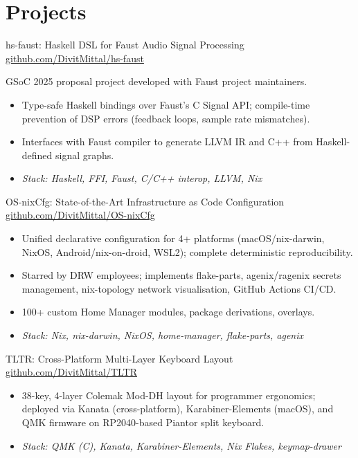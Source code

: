 \documentclass[11pt,a4paper]{moderncv}
\begin{document}
\section{Projects}

%
  {hs-faust: Haskell DSL for Faust Audio Signal Processing}%
  {\href{https://github.com/DivitMittal/hs-faust}{github.com/DivitMittal/hs-faust}}{}{}%
{%
  GSoC 2025 proposal project developed with Faust project maintainers.
  \begin{itemize}
    \item Type-safe Haskell bindings over Faust's C Signal API; compile-time prevention
      of DSP errors (feedback loops, sample rate mismatches).
    \item Interfaces with Faust compiler to generate LLVM IR and C++ from Haskell-defined
      signal graphs.
    \item \textit{Stack: Haskell, FFI, Faust, C/C++ interop, LLVM, Nix}
  \end{itemize}%
}

%
  {OS-nixCfg: State-of-the-Art Infrastructure as Code Configuration }%
  {\href{https://github.com/DivitMittal/OS-nixCfg}{github.com/DivitMittal/OS-nixCfg}}{}{}%
{%
  \begin{itemize}
    \item Unified declarative configuration for 4+ platforms (macOS/nix-darwin,
      NixOS, Android/nix-on-droid, WSL2); complete deterministic reproducibility.
    \item Starred by DRW employees; implements flake-parts, agenix/ragenix secrets
      management, nix-topology network visualisation, GitHub Actions CI/CD.
    \item 100+ custom Home Manager modules, package derivations, overlays.
    \item \textit{Stack: Nix, nix-darwin, NixOS, home-manager, flake-parts, agenix}
  \end{itemize}%
}

%
  {TLTR: Cross-Platform Multi-Layer Keyboard Layout }%
  {\href{https://github.com/DivitMittal/TLTR}{github.com/DivitMittal/TLTR}}{}{}%
{%
  \begin{itemize}
    \item 38-key, 4-layer Colemak Mod-DH layout for programmer ergonomics; deployed via
      Kanata (cross-platform), Karabiner-Elements (macOS), and QMK firmware on
      RP2040-based Piantor split keyboard.
    \item \textit{Stack: QMK (C), Kanata, Karabiner-Elements, Nix Flakes, keymap-drawer}
  \end{itemize}%
}
\end{document}
